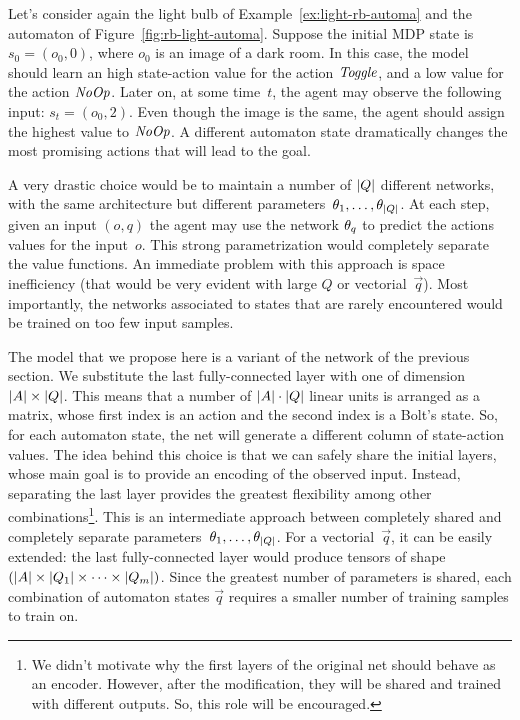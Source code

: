 \begin{example}
	Let's consider again the light bulb of Example~\ref{ex:light-rb-automa} and
	the automaton of Figure~\ref{fig:rb-light-automa}. Suppose the initial MDP
	state is $s_0 = (o_0, 0)$, where $o_0$ is an image of a dark room. In this
	case, the model should learn an high state-action value for the action
	$\text{\textit{Toggle}}$, and a low value for the action $\text{\textit{NoOp}}$. Later on,
	at some time~$t$, the agent may observe the following input: $s_t = (o_0,
	2)$. Even though the image is the same, the agent should assign the highest
	value to $\text{\textit{NoOp}}$. A different automaton state dramatically changes
	the most promising actions that will lead to the goal.
\end{example}

A very drastic choice would be to maintain a number of $\lvert Q\rvert$ different
networks, with the same architecture but different parameters~$\theta_1,
\dots, \theta_{\lvert Q\rvert}$. At each step, given an input $(o, q)$ the agent may
use the network $\theta_q$ to predict the actions values for the input~$o$.
This strong parametrization would completely separate the value functions.
An immediate problem with this approach is space inefficiency (that would be
very evident with large $Q$ or vectorial~$\vec{q}$). Most importantly, the
networks associated to states that are rarely encountered would be trained
on too few input samples.

The model that we propose here is a variant of the network of the previous
section. We substitute the last fully-connected layer with one of dimension
$\lvert A\rvert \times \lvert Q\rvert$. This means that a number of $\lvert A\rvert \cdot \lvert Q\rvert$
linear units is arranged as a matrix, whose first index is an action and
the second index is a Bolt's state. So, for each automaton state, the net will
generate a different column of state-action values. The idea behind this
choice is that we can safely share the initial layers, whose main goal is to
provide an encoding of the observed input. Instead, separating the last layer
provides the greatest flexibility among other combinations\footnote{
	We didn't motivate why the first layers of the original net should behave as
	an encoder. However, after the modification, they will be shared and trained
	with different outputs. So, this role will be encouraged.
}. This is an intermediate approach between completely shared and completely
separate parameters~$\theta_1, \dots, \theta_{\lvert Q\rvert}$. For a
vectorial~$\vec{q}$, it can be easily extended: the last fully-connected layer
would produce tensors of shape $(\lvert A\rvert \times \lvert Q_1\rvert \times \dots \times
\lvert Q_m\rvert)$. Since the greatest number of parameters is shared, each
combination of automaton states $\vec{q}$ requires a smaller number of
training samples to train on.

